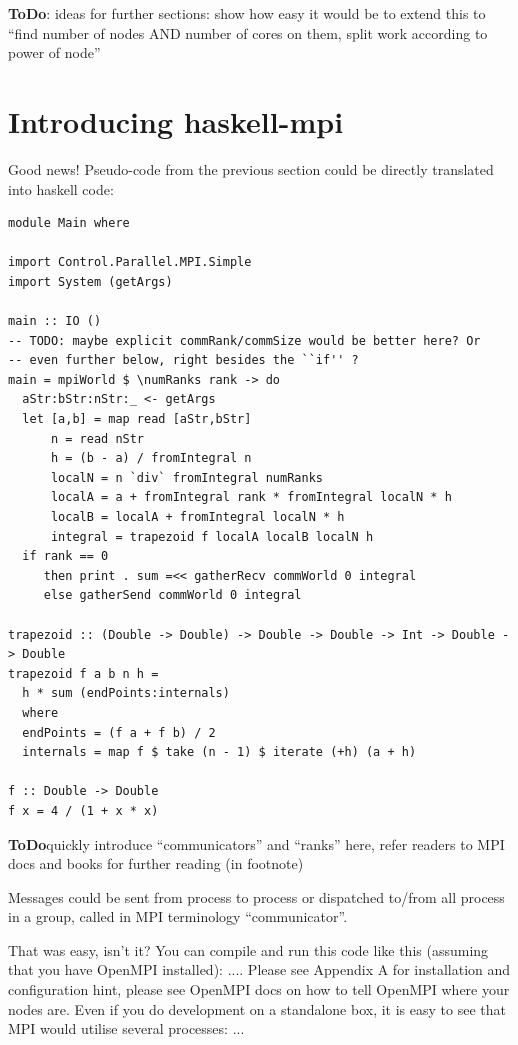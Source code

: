 \documentclass{tmr}
\newcommand{\ToDo}[1]{\textbf{ToDo}{#1}}
\begin{document}
\ToDo: ideas for further sections: show how easy it would be to extend this to ``find number of nodes AND number of cores on them, split work according to power of node''


\section{Introducing haskell-mpi}

Good news! Pseudo-code from the previous section could be directly translated into haskell code:

\begin{Verbatim}
module Main where

import Control.Parallel.MPI.Simple
import System (getArgs)

main :: IO ()
-- TODO: maybe explicit commRank/commSize would be better here? Or
-- even further below, right besides the ``if'' ?
main = mpiWorld $ \numRanks rank -> do
  aStr:bStr:nStr:_ <- getArgs
  let [a,b] = map read [aStr,bStr]
      n = read nStr
      h = (b - a) / fromIntegral n
      localN = n `div` fromIntegral numRanks
      localA = a + fromIntegral rank * fromIntegral localN * h
      localB = localA + fromIntegral localN * h
      integral = trapezoid f localA localB localN h
  if rank == 0
     then print . sum =<< gatherRecv commWorld 0 integral
     else gatherSend commWorld 0 integral

trapezoid :: (Double -> Double) -> Double -> Double -> Int -> Double -> Double
trapezoid f a b n h =
  h * sum (endPoints:internals)
  where
  endPoints = (f a + f b) / 2
  internals = map f $ take (n - 1) $ iterate (+h) (a + h)

f :: Double -> Double
f x = 4 / (1 + x * x)
\end{Verbatim}

\ToDo quickly introduce ``communicators'' and ``ranks'' here, refer readers to MPI docs and books for further reading (in footnote)

Messages could be sent from process to process or
dispatched to/from all process in a group, called in MPI terminology ``communicator''.

That was easy, isn't it? You can compile and run this code like this (assuming that you have OpenMPI installed): .... Please see Appendix A for installation and configuration hint, please see OpenMPI docs on how to tell OpenMPI where your nodes are. Even if you do development on a standalone box, it is easy to see that MPI would utilise several processes: ...
\end{document}
